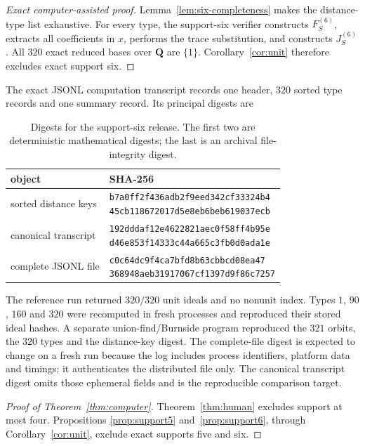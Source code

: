 \documentclass[11pt,reqno]{amsart}
\theoremstyle{definition}
\theoremstyle{remark}
\newcommand{\Q}{\mathbf Q}
\begin{document}
\begin{proof}[Exact computer-assisted proof]
Lemma~\ref{lem:six-completeness} makes the distance-type list exhaustive.
For every type, the support-six verifier constructs $F_S^{(6)}$, extracts
all coefficients in $x$, performs the trace substitution, and constructs
$J_S^{(6)}$.  All $320$ exact reduced bases over $\Q$ are $\{1\}$.
Corollary~\ref{cor:unit} therefore excludes exact support six.
\end{proof}

The exact JSONL computation transcript records one header, $320$ sorted type
records and one summary record.  Its principal digests are
\begin{table}[htbp]
\centering
\caption{Digests for the support-six release.  The first two are
deterministic mathematical digests; the last is an archival file-integrity
digest.}
\label{tab:six-digests}
\begin{tabular}{l>{\raggedright\arraybackslash}p{}}
\toprule
object & SHA-256\\
\midrule
sorted distance keys &
\shortstack[l]{\scriptsize\texttt{b7a0ff2f436adb2f9eed342cf33324b4}\\
\scriptsize\texttt{45cb118672017d5e8eb6beb619037ecb}}\\
canonical transcript &
\shortstack[l]{\scriptsize\texttt{192dddaf12e4622821aec0f58ff4b95e}\\
\scriptsize\texttt{d46e853f14333c44a665c3fb0d0ada1e}}\\
complete JSONL file &
\shortstack[l]{\scriptsize\texttt{c0c64dc9f4ca7bfd8b63cbbcd08ea47}\\
\scriptsize\texttt{368948aeb31917067cf1397d9f86c7257}}\\
\bottomrule
\end{tabular}
\end{table}
The reference run returned $320/320$ unit ideals and no nonunit index.
Types $1$, $90$, $160$ and $320$ were recomputed in fresh processes and
reproduced their stored ideal hashes.  A separate union-find/Burnside program
reproduced the $321$ orbits, the $320$ types and the distance-key digest.
The complete-file digest is expected to change on a fresh run because the
log includes process identifiers, platform data and timings; it authenticates
the distributed file only.  The canonical transcript digest omits those
ephemeral fields and is the reproducible comparison target.

\begin{proof}[Proof of Theorem~\ref{thm:computer}]
Theorem~\ref{thm:human} excludes support at most four.  Propositions
\ref{prop:support5} and~\ref{prop:support6}, through
Corollary~\ref{cor:unit}, exclude exact supports five and six.
\end{proof}
\end{document}
